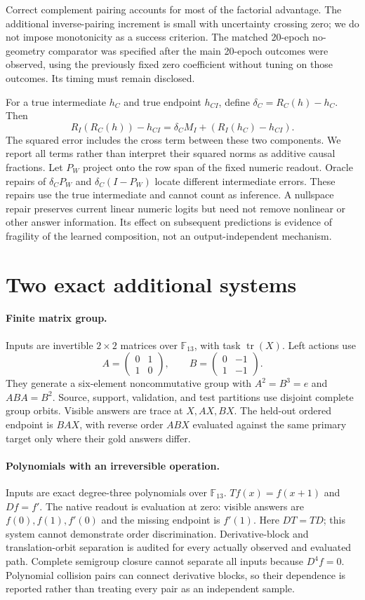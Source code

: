 \documentclass[11pt]{article}
\newcommand{\F}{\mathbb{F}}
\begin{document}
Correct complement pairing accounts for most of the factorial advantage. The additional inverse-pairing increment is small with uncertainty crossing zero; we do not impose monotonicity as a success criterion. The matched 20-epoch no-geometry comparator was specified after the main 20-epoch outcomes were observed, using the previously fixed zero coefficient without tuning on those outcomes. Its timing must remain disclosed.

For a true intermediate $h_C$ and true endpoint $h_{CI}$, define $\delta_C=R_C(h)-h_C$. Then
\[
 R_I(R_C(h))-h_{CI}=\delta_CM_I+(R_I(h_C)-h_{CI}).
\]
The squared error includes the cross term between these two components. We report all terms rather than interpret their squared norms as additive causal fractions.
Let $P_W$ project onto the row span of the fixed numeric readout. Oracle repairs of $\delta_CP_W$ and $\delta_C(I-P_W)$ locate different intermediate errors. These repairs use the true intermediate and cannot count as inference. A nullspace repair preserves current linear numeric logits but need not remove nonlinear or other answer information. Its effect on subsequent predictions is evidence of fragility of the learned composition, not an output-independent mechanism.

\section{Two exact additional systems}
\paragraph{Finite matrix group.}
Inputs are invertible $2\times2$ matrices over $\F_{13}$, with task $\operatorname{tr}(X)$. Left actions use
\[
 A=\begin{pmatrix}0&1\\1&0\end{pmatrix},\qquad
 B=\begin{pmatrix}0&-1\\1&-1\end{pmatrix}.
\]
They generate a six-element noncommutative group with $A^2=B^3=e$ and $ABA=B^2$. Source, support, validation, and test partitions use disjoint complete group orbits. Visible answers are trace at $X,AX,BX$. The held-out ordered endpoint is $BAX$, with reverse order $ABX$ evaluated against the same primary target only where their gold answers differ.

\paragraph{Polynomials with an irreversible operation.}
Inputs are exact degree-three polynomials over $\F_{13}$. $T f(x)=f(x+1)$ and $D f=f'$. The native readout is evaluation at zero: visible answers are $f(0),f(1),f'(0)$ and the missing endpoint is $f'(1)$. Here $DT=TD$; this system cannot demonstrate order discrimination. Derivative-block and translation-orbit separation is audited for every actually observed and evaluated path. Complete semigroup closure cannot separate all inputs because $D^4f=0$. Polynomial collision pairs can connect derivative blocks, so their dependence is reported rather than treating every pair as an independent sample.
\end{document}
